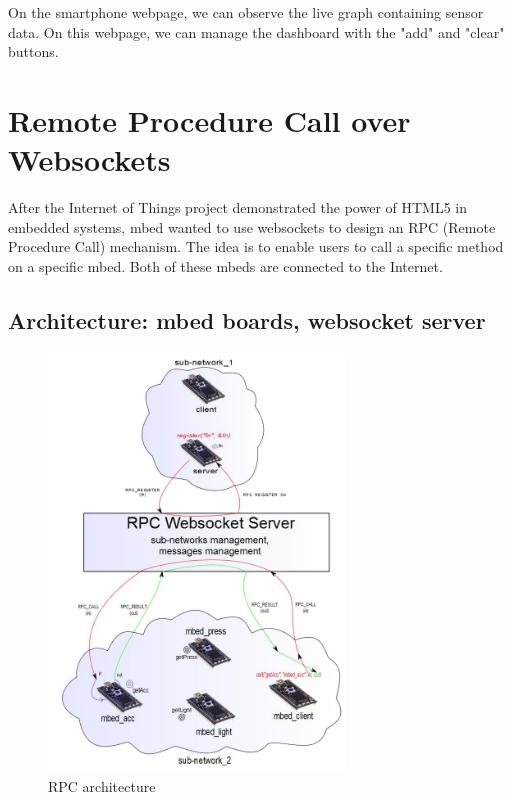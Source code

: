 \documentclass[pdftex,10pt,a4paper]{report}
\begin{document}
On the smartphone webpage, we can observe the live graph containing sensor data. On this webpage, we can manage the dashboard with the "add" and "clear" buttons.













\newpage

\section{Remote Procedure Call over Websockets}
After the Internet of Things project demonstrated the power of HTML5 in embedded systems, mbed wanted to use websockets to design an RPC (Remote Procedure Call) mechanism. The idea is to enable users to call a specific method on a specific mbed. Both of these mbeds are connected to the Internet.

\subsection{Architecture: mbed boards, websocket server}

\begin{figure}[h!]
		\centering
		\includegraphics[width=0.7\textwidth]{./rpc-1.jpg}
		\caption{RPC architecture}
		\label{RPC architecture}
\end{figure}
\end{document}
